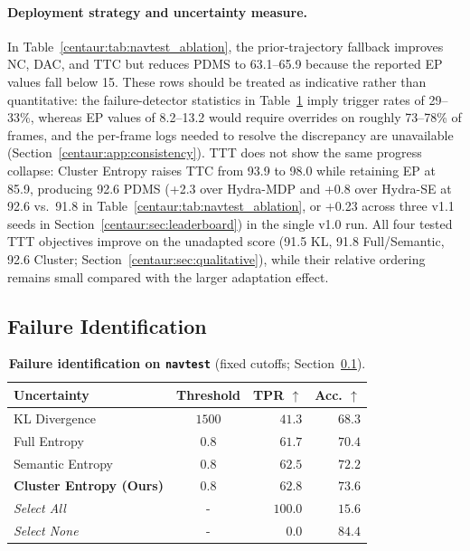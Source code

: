 \paragraph{Deployment strategy and uncertainty measure.} In Table~\ref{centaur:tab:navtest_ablation}, the prior-trajectory fallback improves NC, DAC, and TTC but reduces PDMS to 63.1--65.9 because the reported EP values fall below 15. These rows should be treated as indicative rather than quantitative: the failure-detector statistics in Table~\ref{centaur:tab:fail_class} imply trigger rates of 29--33\%, whereas EP values of 8.2--13.2 would require overrides on roughly 73--78\% of frames, and the per-frame logs needed to resolve the discrepancy are unavailable (Section~\ref{centaur:app:consistency}). TTT does not show the same progress collapse: Cluster Entropy raises TTC from 93.9 to 98.0 while retaining EP at 85.9, producing 92.6 PDMS (+2.3 over Hydra-MDP and +0.8 over Hydra-SE at 92.6 vs.\ 91.8 in Table~\ref{centaur:tab:navtest_ablation}, or +0.23 across three v1.1 seeds in Section~\ref{centaur:sec:leaderboard}) in the single v1.0 run. All four tested TTT objectives improve on the unadapted score (91.5 KL, 91.8 Full/Semantic, 92.6 Cluster; Section~\ref{centaur:sec:qualitative}), while their relative ordering remains small compared with the larger adaptation effect.

\subsection{Failure Identification}\label{centaur:sec:failure}

\begin{table}[t]
  \centering
  \caption[Failure identification on \texttt{navtest}]{\textbf{Failure identification on \texttt{navtest}} (fixed cutoffs; Section~\ref{centaur:sec:failure}).}
  \label{centaur:tab:fail_class}
  \begin{tabular}{l|c|rr}
    \toprule
    \textbf{Uncertainty} & \textbf{Threshold} & \textbf{TPR} $\uparrow$ & \textbf{Acc.} $\uparrow$ \\
    \midrule
    KL Divergence & $1500$ & $41.3$ & $68.3$ \\
    Full Entropy & $0.8$ & $61.7$ & $70.4$ \\
    Semantic Entropy & $0.8$ & $62.5$ & $72.2$ \\
    \textbf{Cluster Entropy (Ours)} & $0.8$ & $\mathbf{62.8}$ & $\mathbf{73.6}$ \\
    \midrule
    \textit{Select All} & - & $\mathit{100.0}$ & $\mathit{15.6}$ \\
    \textit{Select None} & - & $\mathit{0.0}$ & $\mathit{84.4}$ \\
    \bottomrule
  \end{tabular}
\end{table}

